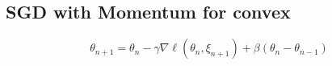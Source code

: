 \documentclass{article}
\begin{document}
\subsection{SGD with Momentum for convex}
\begin{equation}\label{eq:sgdm}
\theta_{n+1} = \theta_{n} - \gamma \nabla \ell ( \theta_{n}, \xi_{n+1} ) + \beta ( \theta_{n} - \theta_{n-1} )
\end{equation}
\newpage






\end{document}
